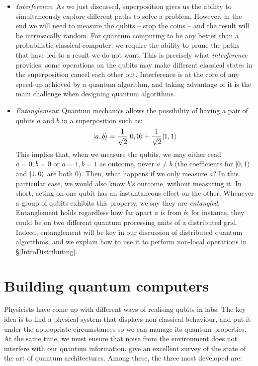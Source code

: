\begin{itemize}
\item \textit{Interference}: As we just discussed, superposition gives us the ability to simultaneously explore different paths to solve a problem. However, in the end we will need to measure the qubits -- stop the coins -- and the result will be intrinsically random. For quantum computing to be any better than a probabilistic classical computer, we require the ability to prune the paths that have led to a result we do not want. This is precisely what \textit{interference} provides: some operations on the qubits may make different classical states in the superposition cancel each other out. Interference is at the core of any speed-up achieved by a quantum algorithm, and taking advantage of it is the main challenge when designing quantum algorithms.

\item \textit{Entanglement}: Quantum mechanics allows the possibility of having a pair of qubits \(a\) and \(b\) in a superposition such as: \[\vert a,b \rangle = \frac{1}{\sqrt{2}}\vert 0,0 \rangle + \frac{1}{\sqrt{2}}\vert 1,1 \rangle\] This implies that, when we measure the qubits, we may either read \(a=0, b=0\) or \(a=1, b=1\) as outcome, never \(a\not=b\) (the coefficients for \(\vert 0,1 \rangle\) and \(\vert 1,0 \rangle\) are both \(0\)). Then, what happens if we only measure \(a\)? In this particular case, we would also know \(b\)'s outcome, without measuring it. In short, acting on one qubit has an instantaneous effect on the other. Whenever a group of qubits exhibits this property, we say they are \textit{entangled}. Entanglement holds regardless how far apart \(a\) is from \(b\); for instance, they could be on two different quantum processing units of a distributed grid. Indeed, entanglement will be key in our discussion of distributed quantum algorithms, and we explain how to use it to perform non-local operations in \S\ref{IntroDistributing}.

\end{itemize}


\section{Building quantum computers}
\label{Hardware}

Physicists have come up with different ways of realising qubits in labs. The key idea is to find a physical system that displays non-classical behaviour, and put it under the appropriate circumstances so we can manage its quantum properties. At the same time, we must ensure that noise from the environment does not interfere with our quantum information. \citet{ArchitectureSurvey} give an excellent survey of the state of the art of quantum architectures. Among these, the three most developed are:

